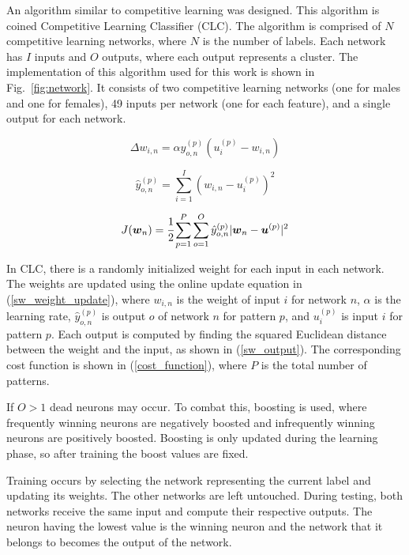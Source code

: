 \documentclass[10pt,journal]{IEEEtran}
\newcommand{\fig}[1]{Fig.~\ref{#1}}
\newcommand{\eq}[1]{(\ref{#1})}
\begin{document}
			An algorithm similar to competitive learning was designed. This algorithm is coined Competitive Learning Classifier (CLC). The algorithm is comprised of \(N\) competitive learning networks, where \(N\) is the number of labels. Each network has \(I\) inputs and \(O\) outputs, where each output represents a cluster. The implementation of this algorithm used for this work is shown in \fig{fig:network}. It consists of two competitive learning networks (one for males and one for females), 49 inputs per network (one for each feature), and a single output for each network.
			
			\begin{equation}
				\label{sw_weight_update}
				\Delta w_{i,n} = \alpha\hat{y}_{o,n}^{(p)}(u_i^{(p)}-w_{i,n})
			\end{equation}
			
			\begin{equation}
				\label{sw_output}
				\hat{y}_{o,n}^{(p)} = \displaystyle\sum_{i=1}^{I}(w_{i,n} - u_i^{(p)})^2
			\end{equation}
			
			\begin{equation}
				\label{cost_function}
				J(\boldsymbol{w}_n) = \cfrac{1}{2}\displaystyle\sum_{p=1}^{P}\displaystyle\sum_{o=1}^{O}\hat{y}_{o,n}^{(p)}|\boldsymbol{w}_n-\boldsymbol{u}^{(p)}|^2
			\end{equation}
			
			In CLC, there is a randomly initialized weight for each input in each network. The weights are updated using the online update equation in \eq{sw_weight_update}, where \(w_{i,n}\) is the weight of input \(i\) for network \(n\), \(\alpha\) is the learning rate, \(\hat{y}_{o,n}^{(p)}\) is output \(o\) of network \(n\) for pattern \(p\), and \(u_i^{(p)}\) is input \(i\) for pattern \(p\). Each output is computed by finding the squared Euclidean distance between the weight and the input, as shown in \eq{sw_output}. The corresponding cost function is shown in \eq{cost_function}, where \(P\) is the total number of patterns.
			
			If \(O>1\) dead neurons may occur. To combat this, boosting is used, where frequently winning neurons are negatively boosted and infrequently winning neurons are positively boosted. Boosting is only updated during the learning phase, so after training the boost values are fixed.
			
			Training occurs by selecting the network representing the current label and updating its weights. The other networks are left untouched. During testing, both networks receive the same input and compute their respective outputs. The neuron having the lowest value is the winning neuron and the network that it belongs to becomes the output of the network.
			
\end{document}
